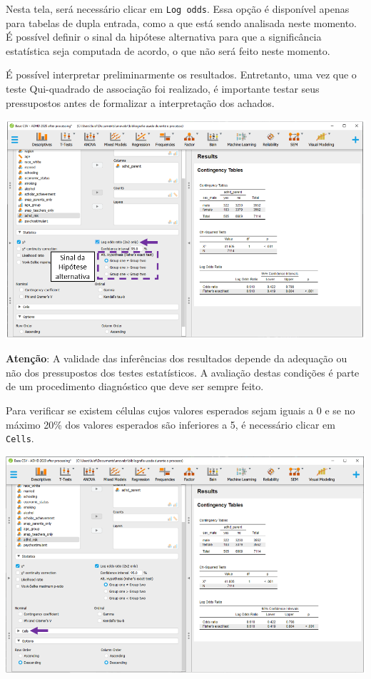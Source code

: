 \documentclass[
]{book}
\begin{document}
Nesta tela, será necessário clicar em \texttt{Log\ odds}. Essa opção é disponível apenas para tabelas de dupla entrada, como a que está sendo analisada neste momento. É possível definir o sinal da hipótese alternativa para que a significância estatística seja computada de acordo, o que não será feito neste momento.

É possível interpretar preliminarmente os resultados. Entretanto, uma vez que o teste Qui-quadrado de associação foi realizado, é importante testar seus pressupostos antes de formalizar a interpretação dos achados.

\includegraphics{./img/cap_x2_log_odds.png}

\textbf{Atenção}: A validade das inferências dos resultados depende da adequação ou não dos pressupostos dos testes estatísticos. A avaliação destas condições é parte de um procedimento diagnóstico que deve ser sempre feito.

Para verificar se existem células cujos valores esperados sejam iguais a 0 e se no máximo 20\% dos valores esperados são inferiores a 5, é necessário clicar em \texttt{Cells}.

\includegraphics{./img/cap_x2_assumptions_or.png}
\end{document}
